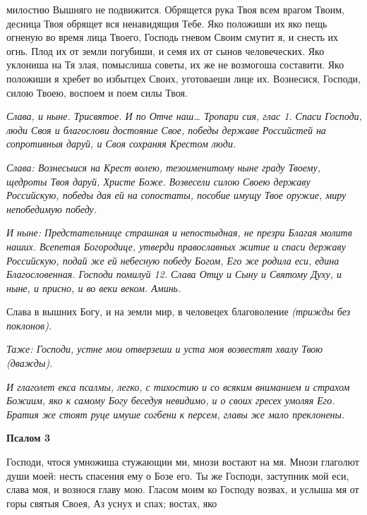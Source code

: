 милостию Вышняго не подвижится. Обрящется рука Твоя всем врагом
Твоим, десница Твоя обрящет вся ненавидящия Тебе. Яко положиши их яко
пещь огненую во время лица Твоего, Господь гневом Своим смутит я,
и снесть их огнь. Плод их от земли погубиши, и семя их от сынов
человеческих. Яко уклониша на Тя злая, помыслиша советы, их же не
возмогоша составити. Яко положиши я хребет во избытцех Своих,
уготоваеши лице их. Вознесися, Господи, силою Твоею, воспоем и поем силы
Твоя.


 \itshape Слава, и ныне\normalfont{}. \itshape Трисвятое\normalfont{}. \itshape И по\normalfont{} Отче наш… \itshape Тропари сия, глас 1.\normalfont{}
Спаси Господи, люди Своя и благослови достояние Свое, победы
державе Российстей на сопротивныя даруй, и Своя сохраняя Крестом
люди.


 \itshape Слава:\normalfont{} Вознесыися на Крест волею, тезоименитому ныне граду Твоему,
щедроты Твоя даруй, Христе Боже. Возвесели силою Своею державу
Российскую, победы дая ей на сопостаты, пособие имущу Твое оружие, миру
непобедимую победу.


 \itshape И ныне:\normalfont{} Предстательнице страшная и непостыдная, не презри Благая
молитв наших. Всепетая Богородице, утверди православных житие и
спаси державу Российскую, подай же ей небесную победу Богом, Его
же родила еси, едина Благословенная. Господи помилуй \itshape 12\normalfont{}. Слава
Отцу и Сыну и Святому Духу, и ныне, и присно, и во веки веком.
Аминь.


   Слава в вышних Богу, и на земли мир, в человецех благоволение \itshape (трижды
без поклонов)\normalfont{}.


 \itshape Таже:\normalfont{} Господи, устне мои отверзеши и уста моя возвестят хвалу Твою
\itshape (дважды)\normalfont{}.


 \itshape И глаголет екса псалмы, легко, с тихостию и со всяким вниманием и
страхом Божиим, яко к самому Богу беседуя невидимо, и о своих гресех
умоляя Его. Братия же стоят руце имуше согбени к персем, главы же мало
преклонены.\normalfont{}






 

\bfseries Псалом 3\normalfont{}


   Господи, чтося умножиша стужающии ми, мнози востают на мя. Мнози
глаголют души моей: несть спасения ему о Бозе его. Ты же Господи,
заступник мой еси, слава моя, и вознося главу мою. Гласом моим ко Господу
возвах, и услыша мя от горы святыя Своея, Аз уснух и спах; востах, яко

